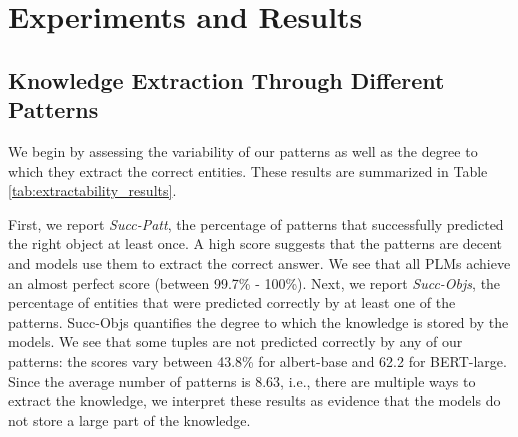 \section{Experiments and Results}
\label{sec:experiments}


% 



\subsection{Knowledge Extraction Through Different Patterns}




We begin by assessing the variability of our patterns as
well as the degree to which they extract the correct
entities. These results are summarized in Table
\ref{tab:extractability_results}.

First, we report \emph{Succ-Patt}, the percentage of
patterns that successfully predicted the right object at
least once. A high score  suggests that the patterns are
decent and models use  them to extract the correct
answer. We see that all PLMs achieve an almost perfect score (between 99.7\% - 100\%).
Next, we report
\emph{Succ-Objs},
the percentage of entities that were predicted correctly by at least one of the patterns.
Succ-Objs quantifies the degree to which the knowledge is stored by the models.
We see that some tuples are not predicted correctly by any of our patterns: the scores vary between 43.8\% for albert-base and 62.2 for BERT-large.
Since the average number of patterns is 8.63, i.e., there
are multiple ways to extract the knowledge, we interpret
these results as evidence that the models do not store a large part of the
\resource{} knowledge.


